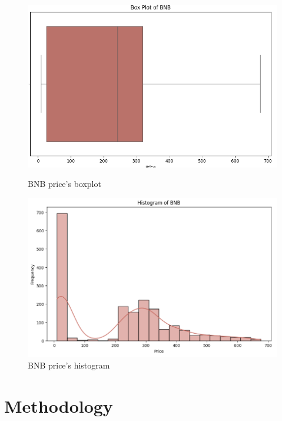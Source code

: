 \documentclass{ieeeojies}
\begin{document}
\begin{figure}[H]
	\centering
	\begin{minipage}{0.23\textwidth}
		\centering
		\includegraphics[width=1\textwidth]{bibliography/Figure/BNB_BoxPlot.PNG}
		\caption{BNB price's boxplot}
		\label{fig:1}
	\end{minipage}
	\hfill
	\begin{minipage}{0.23\textwidth}
		\centering
		\includegraphics[width=1\textwidth]{bibliography/Figure/BNB_Histogram.PNG}
		\caption{BNB price's histogram}
		\label{fig:2}
	\end{minipage}
\end{figure}
\section{Methodology}
\end{document}
